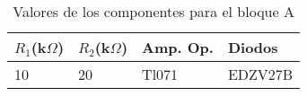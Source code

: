 \begin{table}[htb]
\centering
\caption{Valores de los componentes para el bloque A}
\label{tabla:componentesA}
\begin{tabular}{|l|l|l|l|}
\hline
$R_1$(k$\Omega$) & $R_2$(k$\Omega$) & Amp. Op. & Diodos \\ \hline
10 & 20 & Tl071    & EDZV27B \\ \hline
\end{tabular}
\end{table}